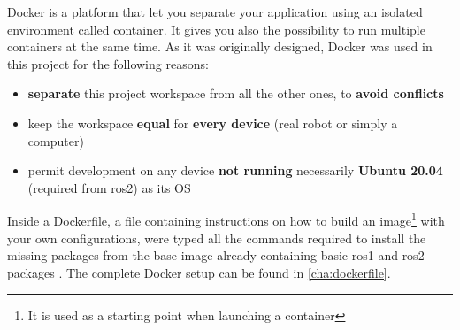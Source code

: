 Docker is a platform that let you separate your application using an isolated environment called container. It gives you also the possibility to run multiple containers at the same time. As it was originally designed, Docker was used in this project for the following reasons: %
  
\begin{itemize}
    \item \textbf{separate} this project workspace from all the other ones, to \textbf{avoid conflicts}
    \item keep the workspace \textbf{equal} for \textbf{every device} (real robot or simply a computer)
    \item permit development on any device \textbf{not running} necessarily \textbf{Ubuntu 20.04} (required from \acrshort{ros}2) as its OS
\end{itemize}  
  
Inside a Dockerfile, a file containing instructions on how to build an image\footnote{It is used as a starting point when launching a container} with your own configurations, were typed all the commands required to install the missing packages from the base image already containing basic \acrshort{ros}1 and \acrshort{ros}2 packages \cite{dockerimage}. The complete Docker setup can be found in \autoref{cha:dockerfile}.